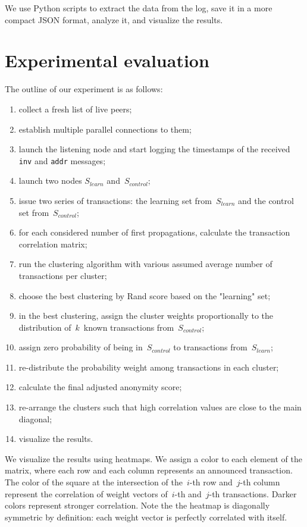 We use Python scripts to extract the data from the log, save it in a more compact JSON format, analyze it, and visualize the results.

\section{Experimental evaluation}

The outline of our experiment is as follows:

\begin{enumerate}
	\item collect a fresh list of live peers;
	\item establish multiple parallel connections to them;
	\item launch the listening node and start logging the timestamps of the received \texttt{inv} and \texttt{addr} messages;
	\item launch two nodes $S_{learn}$ and~$S_{control}$;%
	\item issue two series of transactions: the learning set from~$S_{learn}$ and the control set from~$S_{control}$;
	\item for each considered number of first propagations, calculate the transaction correlation matrix;
	\item run the clustering algorithm with various assumed average number of transactions per cluster;
	\item choose the best clustering by Rand score based on the "learning" set;
	\item in the best clustering, assign the cluster weights proportionally to the distribution of~$k$~known transactions from~$S_{control}$;
	\item assign zero probability of being in~$S_{control}$ to transactions from~$S_{learn}$;
	\item re-distribute the probability weight among transactions in each cluster;
	\item calculate the final adjusted anonymity score;
	\item re-arrange the clusters such that high correlation values are close to the main diagonal;
	\item visualize the results.
\end{enumerate}

We visualize the results using heatmaps.
We assign a color to each element of the matrix, where each row and each column represents an announced transaction.
The color of the square at the intersection of the~$i$-th row and~$j$-th column represent the correlation of weight vectors of~$i$-th and~$j$-th transactions.
Darker colors represent stronger correlation.
Note the the heatmap is diagonally symmetric by definition: each weight vector is perfectly correlated with itself.


